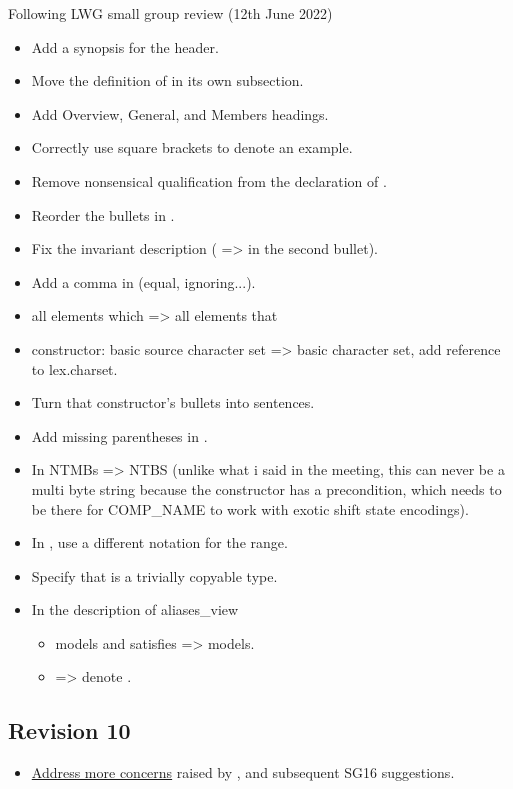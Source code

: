 \documentclass{wg21}
\begin{document}
Following LWG small group review (12th June 2022)
\begin{itemize}
    \item Add a synopsis for the  header.
    \item Move the definition of  in its own subsection.
    \item Add Overview, General, and Members headings.
    \item Correctly use square brackets to denote an example.
    \item Remove nonsensical  qualification from the declaration of .
    \item Reorder the bullets in .
    \item Fix the  invariant description ( =>  in the second bullet).
    \item Add a comma in  (equal, ignoring...).
    \item all elements which => all elements that
    \item {} constructor: basic source character set => basic character set, add reference to lex.charset.
    \item Turn that constructor's bullets into sentences.
    \item Add missing parentheses in .
    \item In  NTMBs => NTBS (unlike what i said in the meeting, this can never be a multi byte string because the constructor has a precondition, which needs to be there for COMP_NAME to work with exotic shift state encodings).
    \item In , use a different notation for the range.
    \item Specify that  is a trivially copyable type.
    \item In the description of aliases_view
    \begin{itemize}
        \item {} models and satisfies =>  models.
        \item {} => denote .
    \end{itemize}
\end{itemize}

\subsection*{Revision 10}
\begin{itemize}
\item \hyperref[P2498-concerns]{Address more concerns} raised by , and subsequent SG16 suggestions.
\end{itemize}
\end{document}
